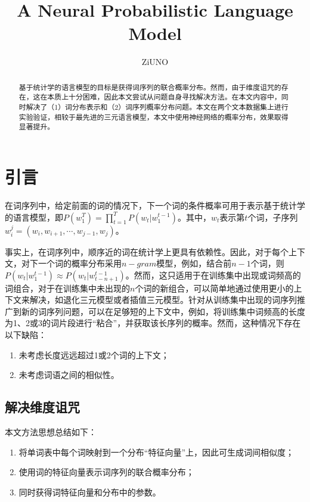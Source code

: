 \documentclass[UTF8]{ctexart}
\title{A Neural Probabilistic Language Model}
\author{ZiUNO}
\date{}
\begin{document}
\maketitle
\begin{abstract}
基于统计学的语言模型的目标是获得词序列的联合概率分布。然而，由于维度诅咒的存在，这在本质上十分困难，因此本文尝试从问题自身寻找解决方法。在本文内容中，同时解决了（1）词分布表示和（2）词序列概率分布问题。本文在两个文本数据集上进行实验验证，相较于最先进的三元语言模型，本文中使用神经网络的概率分布，效果取得显著提升。
\end{abstract}
\section{引言}
\par{在词序列中，给定前面的词的情况下，下一个词的条件概率可用于表示基于统计学的语言模型，即$P(w_{1}^T)=\prod_{t=1}^TP(w_{t}|w_{1}^{t-1})$。其中，$w_{t}$表示第$t$个词，子序列$w_{i}^j=(w_{i},w_{i+1},\cdots,w_{j-1},w_{j})$。}
\par{事实上，在词序列中，顺序近的词在统计学上更具有依赖性。因此，对于每个上下文，对下一个词的概率分布采用$n-gram$模型，例如，结合前$n-1$个词，则$P(w_{t}|w_{1}^{t-1})\approx P(w_{t}|w_{t-n+1}^{t-1})$。然而，这只适用于在训练集中出现或词频高的词组合，对于在训练集中未出现的$n$个词的新组合，可以简单地通过使用更小的上下文来解决，如退化三元模型或者插值三元模型。针对从训练集中出现的词序列推广到新的词序列问题，可以在足够短的上下文中，例如，将训练集中词频高的长度为1、2或3的词片段进行“粘合”，并获取该长序列的概率。然而，这种情况下存在以下缺陷：}
\begin{enumerate}
  \item 未考虑长度远远超过1或2个词的上下文；
  \item 未考虑词语之间的相似性。
\end{enumerate}
\subsection{解决维度诅咒}
本文方法思想总结如下：
\begin{enumerate}
  \item 将单词表中每个词映射到一个分布“特征向量”上，因此可生成词间相似度；
  \item 使用词的特征向量表示词序列的联合概率分布；
  \item 同时获得词特征向量和分布中的参数。
\end{enumerate}
\end{document}
